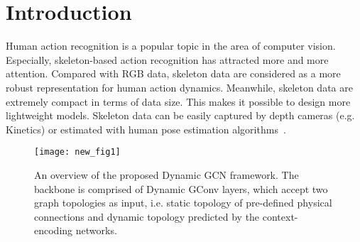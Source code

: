 \documentclass[sigconf]{acmart}
\begin{document}




\maketitle

\section{Introduction}
Human action recognition is a popular topic in the area of computer vision. Especially, skeleton-based action recognition has attracted more and more attention. Compared with RGB data, skeleton data are considered as a more robust representation for human action dynamics. Meanwhile, skeleton data are extremely compact in terms of data size. This makes it possible to design more lightweight models. Skeleton data can be easily captured by depth cameras (e.g. Kinetics) or estimated with human pose estimation algorithms~\cite{chen2018cascaded,wei2016convolutional,cao2018openpose}.

\begin{figure}[t]
\centering
\texttt{[image: new\_fig1]}
\caption{An overview of the proposed Dynamic GCN framework. The backbone is comprised of  Dynamic GConv layers, which accept two graph topologies as input, i.e. static topology  of pre-defined physical connections and dynamic topology  predicted by the context-encoding networks.}
\label{fig1}
\end{figure}
\end{document}
